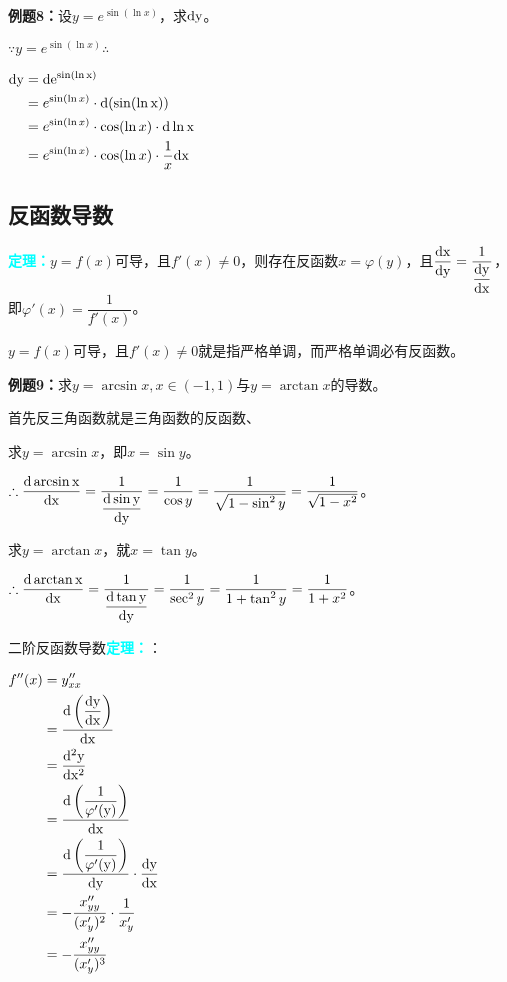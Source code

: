 \documentclass[UTF8, 12pt]{ctexart}
\begin{document}
\textbf{例题8：}设$y=e^{\sin(\ln x)}$，求$\rm{d}y$。

$\because y=e^{\sin(\ln x)} \therefore$

$
\begin{aligned}
    \rm{d}y &=\rm{d}e^{\sin(\ln x)} \\
    & =e^{\sin(\ln x)}\cdot\rm{d}(\sin(\ln x)) \\
    & =e^{\sin(\ln x)}\cdot\cos(\ln x)\cdot\rm{d}\ln x \\
    & =e^{\sin(\ln x)}\cdot\cos(\ln x)\cdot\dfrac{1}{x}\rm{d}x
\end{aligned}
$

\subsection{反函数导数}

\textcolor{aqua}{\textbf{定理：}}$y=f(x)$可导，且$f'(x)\neq 0$，则存在反函数$x=\varphi(y)$，且$\dfrac{\rm{d}x}{\rm{d}y}=\dfrac{1}{\dfrac{\rm{d}y}{\rm{d}x}}$，即$\varphi'(x)=\dfrac{1}{f'(x)}$。

$y=f(x)$可导，且$f'(x)\neq 0$就是指严格单调，而严格单调必有反函数。

\textbf{例题9：}求$y=\arcsin x,x\in(-1,1)$与$y=\arctan x$的导数。

首先反三角函数就是三角函数的反函数、

求$y=\arcsin x$，即$x=\sin y$。

$\therefore\dfrac{\rm{d}\arcsin x}{\rm{d}x}=\dfrac{1}{\dfrac{\rm{d}\sin y}{\rm{d}y}}=\dfrac{1}{\cos y}=\dfrac{1}{\sqrt{1-\sin^2y}}=\dfrac{1}{\sqrt{1-x^2}}$。

求$y=\arctan x$，就$x=\tan y$。

$\therefore\dfrac{\rm{d}\arctan x}{\rm{d}x}=\dfrac{1}{\dfrac{\rm{d}\tan y}{\rm{d}y}}=\dfrac{1}{\sec^2y}=\dfrac{1}{1+\tan^2y}=\dfrac{1}{1+x^2}$。

二阶反函数导数\textcolor{aqua}{\textbf{定理：}}：

$
\begin{aligned}
    f''(x) &=y''_{xx} \\
    & =\dfrac{\rm{d}\left(\dfrac{\rm{d}y}{\rm{d}x}\right)}{\rm{d}x} \\
    & =\dfrac{\rm{d}^2y}{\rm{d}x^2} \\
    & =\dfrac{\rm{d}\left(\dfrac{1}{\varphi'(y)}\right)}{\rm{d}x} \\
    & =\dfrac{\rm{d}\left(\dfrac{1}{\varphi'(y)}\right)}{\rm{d}y}\cdot\dfrac{\rm{d}y}{\rm{d}x} \\
    & =-\dfrac{x_{yy}''}{(x_y')^2}\cdot\dfrac{1}{x_y'} \\
    & =-\dfrac{x_{yy}''}{(x_y')^3}
\end{aligned}
$
\end{document}
